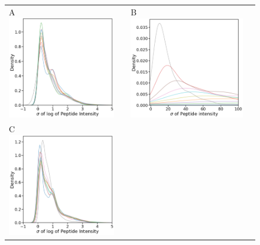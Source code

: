 \documentclass[11pt]{article}
\begin{document}
\begin{figure}[hbt]
    \centering
    \centering
    \begin{tabular}{lclc} 
        A \includegraphics[width=0.5\linewidth]{../../result/mu_sigma_variance_plots/osw_log/osw_kde_qvalFiltered_pepFiltered_qbinned.png} & &%
        B \includegraphics[width=0.5\linewidth]{../../result/mu_sigma_variance_plots/osw/osw_kde_nolog_qvalFiltered_pepFiltered_qbinned.png} & \\%
        C \includegraphics[width=0.5\linewidth]{../../result/mu_sigma_variance_plots/diann_log/diann_kde_qvalFiltered_pepFiltered_qbinned.png} & &%

\end{tabular}
\end{figure}
\end{document}
